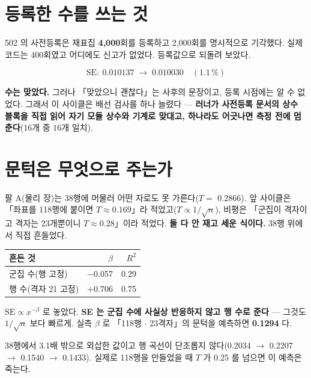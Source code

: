 \documentclass[10pt]{article}
\begin{document}
\section{등록한 수를 쓰는 것}

502 의 사전등록은 재표집 \textbf{4{,}000}회를 등록하고 2{,}000회를 명시적으로 기각했다.
실제 코드는 400회였고 어디에도 신고가 없었다. 등록값으로 되돌려 보았다.

\[
\mathrm{SE}:\ 0.010137 \;\longrightarrow\; 0.010030 \quad (1.1\,\%)
\]

\textbf{수는 맞았다.} 그러나 「맞았으니 괜찮다」는 사후의 문장이고, 등록 시점에는 알 수
없었다. 그래서 이 사이클은 배선 검사를 하나 늘렸다 --- \textbf{러너가 사전등록 문서의
상수 블록을 직접 읽어 자기 모듈 상수와 기계로 맞대고, 하나라도 어긋나면 측정 전에
멈춘다}(16개 중 16개 일치).

\section{문턱은 무엇으로 주는가}

팔 A(물리 장)는 38행에 머물러 어떤 자로도 못 가른다($T = $ 0.2866). 앞 사이클은
「좌표를 118행에 붙이면 $T \approx 0.169$」라 적었고($T \propto 1/\sqrt{n}$), 비평은
「군집이 격자이고 격자는 23개뿐이니 $T \approx 0.28$」이라 적었다. \textbf{둘 다 안 재고
세운 식이다.} 38행 위에서 직접 흔들었다.

\begin{center}\small
\begin{tabular}{lrr}
\hline
흔든 것 & $\beta$ & $R^2$ \\
\hline
군집 수(행 고정) & $-$0.057 & 0.29 \\
행 수(격자 21 고정) & $+$0.706 & 0.75 \\
\hline
\end{tabular}
\end{center}

$\mathrm{SE} \propto x^{-\beta}$ 로 놓았다. \textbf{SE 는 군집 수에 사실상 반응하지 않고
행 수로 준다} --- 그것도 $1/\sqrt{n}$ 보다 빠르게. 실측 $\beta$ 로 「118행 $\cdot$ 23격자」의
문턱을 예측하면 \textbf{0.1294} 다.

{38행에서 3.1배 밖으로 외삽한 값이고 행 곡선이 단조롭지 않다(0.2034 $\to$ 0.2207 $\to$
0.1540 $\to$ 0.1433). 실제로 118행을 만들었을 때 $T$ 가 0.25 를 넘으면 이 예측은 죽는다.}
\end{document}
